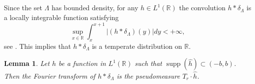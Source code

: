 \documentclass[reqno,a4paper,12pt]{amsart}
\numberwithin{equation}{section}
\numberwithin{figure}{section}
\newcommand\R{\mathbb{R}}
\newcommand\Lam{\Lambda}
\newcommand\1{\mathds{1}}
\newcommand\sbt{\subset}
\newcommand{\ft}[1]{\widehat{#1}}
\newcommand{\supp}{\operatorname{supp}}
\theoremstyle{plain}
\newtheorem{lem}[thm]{Lemma}
\theoremstyle{definition}
\begin{document}
\subsection{}
Since the set $\Lam$ has bounded density,
 for any  $h \in L^1(\R)$ the convolution
$h \ast \delta_\Lam$ is a locally integrable
function satisfying
\begin{equation}
  \label{eqP1.13}
\sup_{x \in \R} \int_{x}^{x+1} |(h \ast \delta_\Lam)(y)| dy < +\infty,
\end{equation}
see \cite[Lemma 2.2]{KL96}. This implies that $h \ast \delta_\Lambda$ 
is a temperate distribution on $\mathbb R$.


\begin{lem}
  \label{lemR14.3}
Let $h$ be a function in $L^1(\R)$ such that $\supp(\ft{h}) \sbt (-b,b)$.
Then the Fourier transform of $h \ast \delta_\Lam$
is the pseudomeasure $T_r  \cdot \ft{h}$.
\end{lem}
\end{document}
